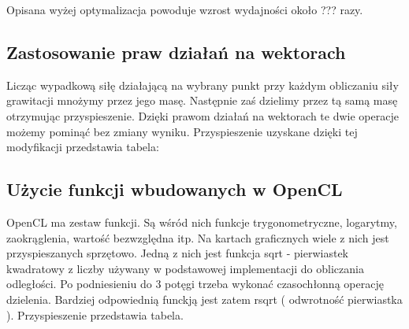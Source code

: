 Opisana wyżej optymalizacja powoduje wzrost wydajności około ??? razy. 


\subsection { Zastosowanie praw działań na wektorach }
Licząc wypadkową siłę działającą na wybrany punkt przy każdym obliczaniu siły grawitacji mnożymy przez jego masę. Następnie zaś dzielimy przez tą samą masę otrzymując przyspieszenie. Dzięki prawom działań na wektorach te dwie operacje możemy pominąć bez zmiany wyniku. Przyspieszenie uzyskane dzięki tej modyfikacji przedstawia tabela:


\subsection { Użycie funkcji wbudowanych w OpenCL }
OpenCL ma zestaw funkcji. Są wśród nich funkcje trygonometryczne, logarytmy, zaokrąglenia, wartość bezwzględna itp. Na kartach graficznych wiele z nich jest przyspieszanych sprzętowo. Jedną z nich jest funkcja sqrt - pierwiastek kwadratowy z liczby używany w podstawowej implementacji do obliczania odległości. Po podniesieniu do 3 potęgi trzeba wykonać czasochłonną operację dzielenia. Bardziej odpowiednią funckją jest zatem rsqrt ( odwrotność pierwiastka ). Przyspieszenie przedstawia tabela.
